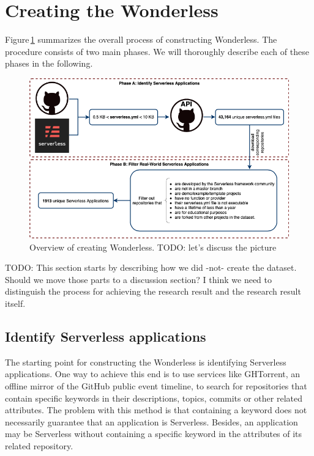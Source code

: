 \section{Creating the Wonderless}
\label{dataset}

Figure\,\ref{fig:overview} summarizes the overall process of constructing Wonderless. 
The procedure consists of two main phases. 
We will thoroughly describe each of these phases in the following.

\begin{figure}
	\centering
	\includegraphics[scale=0.55]{figures/msr}
	\caption{Overview of creating Wonderless. TODO: let's discuss the picture}
	\label{fig:overview}
\end{figure}

TODO: This section starts by describing how we did -not- create the dataset.
Should we move those parts to a discussion section?
I think we need to distinguish the process for achieving the research result and the 
research result itself.

\subsection{Identify Serverless applications} \label{phaseA}
The starting point for constructing the Wonderless is identifying Serverless 
applications. One way to achieve this end is to use services like 
GHTorrent\cite{gousios2012ghtorrent}, 
an offline mirror of the GitHub public event timeline, to search for repositories 
that contain specific keywords in their descriptions, topics, commits or other 
related attributes. The problem with this method is that containing a keyword 
does not necessarily guarantee that an application is Serverless. Besides, an 
application may be Serverless without containing a specific keyword in the 
attributes of its related repository.

